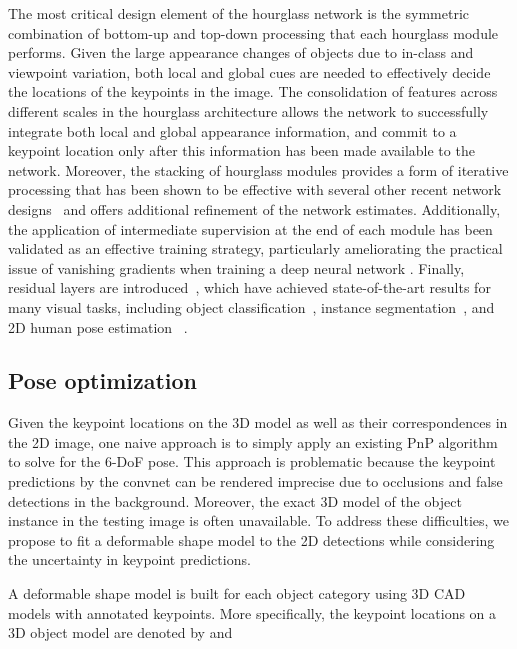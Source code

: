 \documentclass[letterpaper, 10 pt, conference]{ieeeconf}
\begin{document}
\vspace{5pt}
The most critical design element of the hourglass network is the symmetric combination of bottom-up and top-down processing that each hourglass module performs. Given the large appearance changes of objects due to in-class and viewpoint variation, both local and global cues are needed to effectively decide the locations of the keypoints in the image. The consolidation of features across different scales in the hourglass architecture allows the network to successfully integrate both local and global appearance information, and commit to a keypoint location only after this information has been made available to the network. Moreover, the stacking of hourglass modules provides a form of iterative processing that has been shown to be effective with several other recent network designs~\cite{carreira2015iterative,wei2016cpm} and offers additional refinement of the network estimates. Additionally, the application of intermediate supervision at the end of each module has been validated as an effective training strategy, particularly ameliorating the practical issue of vanishing gradients when training a deep neural network \cite{lee2015deeply}. Finally, residual layers are introduced~\cite{he2015residual}, which have achieved state-of-the-art results for many visual tasks, including object classification~\cite{he2015residual}, instance segmentation~\cite{dai2015instance}, and 2D human pose estimation ~\cite{newell2016stacked}. 
\subsection{Pose optimization}\label{sec:optimization}
Given the keypoint locations on the 3D model as well as their correspondences in the 2D image, one naive approach is to simply apply an existing PnP algorithm to solve for the 6-DoF pose. This approach is problematic because the keypoint predictions by the convnet can be rendered imprecise due to occlusions and false detections in the background. Moreover, the exact 3D model of the object instance in the testing image is often unavailable. To address these difficulties, we propose to fit a deformable shape model to the 2D detections
 while considering the uncertainty in keypoint predictions.   

A deformable shape model is built for each object category using 3D CAD models with annotated keypoints. More specifically, the  keypoint locations on a 3D object model are denoted by  and
\end{document}
